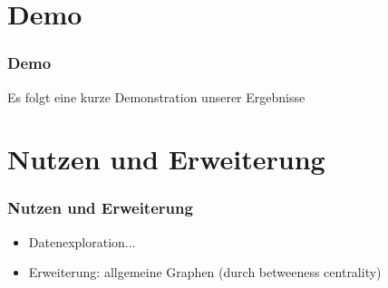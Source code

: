 \documentclass[11pt]{beamer}
\begin{document}
\begin{frame}
\begin{frame}
\end{frame}



\section{Demo}
\begin{frame}
\frametitle{Demo}

Es folgt eine kurze Demonstration unserer Ergebnisse

\end{frame}


\section{Nutzen und Erweiterung}
\begin{frame}
\frametitle{Nutzen und Erweiterung}

\begin{itemize}
\item Datenexploration...
\item Erweiterung: allgemeine Graphen (durch betweeness centrality)
\end{itemize}

\end{frame}
\end{document}
